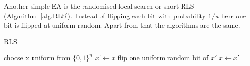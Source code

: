 Another simple EA is the randomised local search or short RLS (Algorithm~\ref{alg:RLS}).\
Instead of flipping each bit with probability $1/n$ here one bit is flipped at uniform random.
Apart from that the algorithms are the same.
\begin{algorithm}[bt]
      \caption{\textsc{RLS}}\label{alg:RLS}

      \DontPrintSemicolon %

      \BlankLine
      choose x uniform from ${\{0,1\}}^n$\;
      {
      $x' \leftarrow x$\;
      flip one uniform random bit of $x'$\;
      {
      {
            $x \leftarrow x'$\;
      }
      }
      }
\end{algorithm}

